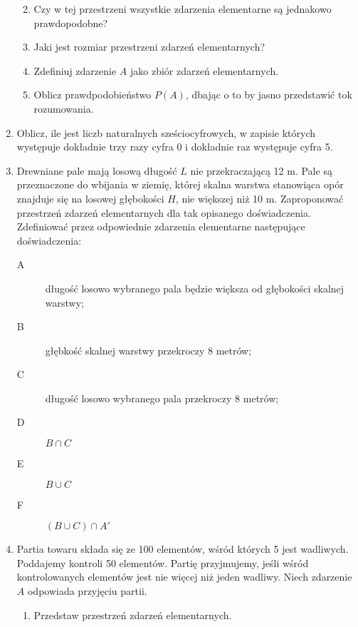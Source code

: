 \documentclass[twoside]{mwart}
\newcommand{\ans}[1]{}
\newcommand{\ans}[1]{\par\emph{Odpowiedź:} #1}
\begin{document}
\begin{enumerate}
\begin{enumerate}
{}%
\item Czy w tej przestrzeni wszystkie zdarzenia elementarne są jednakowo prawdopodobne? \ans{Tak (zakładając, że klienci zamawiają dania niezależnie od siebie i }%
\item Jaki jest rozmiar przestrzeni zdarzeń elementarnych? \ans{$\left|\Omega\right|=6^5$}%
\item Zdefiniuj zdarzenie $A$ jako zbiór zdarzeń elementarnych. \ans{$A=\{(i_1,\ldots,i_5)|\exists j: i_j=1 \land \forall k\neq j: i_k\neq 1\}$, $\left|A\right|=5\cdot5^4$}%
\item Oblicz prawdpodobieństwo $P(A)$, dbając o to by jasno przedstawić tok rozumowania. \ans{$P(A)=\frac{5^5}{6^5}=\frac{5}{6}^5\approx 0{,}40$}%
\end{enumerate}%
\item Oblicz, ile jest liczb naturalnych sześciocyfrowych, w zapisie których występuje dokładnie trzy razy cyfra 0 i dokładnie raz występuje cyfra 5. %
\item  Drewniane pale mają losową długość $L$ nie przekraczającą 12 m. Pale są przeznaczone do wbijania w ziemię, której skalna warstwa stanowiąca opór znajduje się na losowej głębokości $H$, nie większej niż 10 m. Zaproponować przestrzeń zdarzeń elementarnych dla tak opisanego doświadczenia. Zdefiniować przez odpowiednie zdarzenia elementarne następujące doświadczenia:
\begin{description}
\item[A] długość losowo wybranego pala będzie większa od głębokości skalnej warstwy;
\item[B] głębkość skalnej warstwy przekroczy 8 metrów;
\item[C] długość losowo wybranego pala przekroczy 8 metrów;
\item[D] $B\cap C$
\item[E] $B\cup C$
\item[F] $(B\cup C)\cap A'$
\end{description}
\item Partia towaru składa się ze 100 elementów, wśród których 5 jest wadliwych. Poddajemy kontroli 50 elementów. Partię przyjmujemy, jeśli wśród kontrolowanych elementów jest nie więcej niż jeden wadliwy. Niech zdarzenie $A$ odpowiada przyjęciu partii.
\begin{enumerate}%
\item Przedstaw przestrzeń zdarzeń elementarnych. \ans{$\Omega=\{\omega_J|\left|J\right|=50 \land J\subset\{1,2,\ldots,100\}\}$}%

\end{enumerate}
\end{enumerate}
\end{document}
